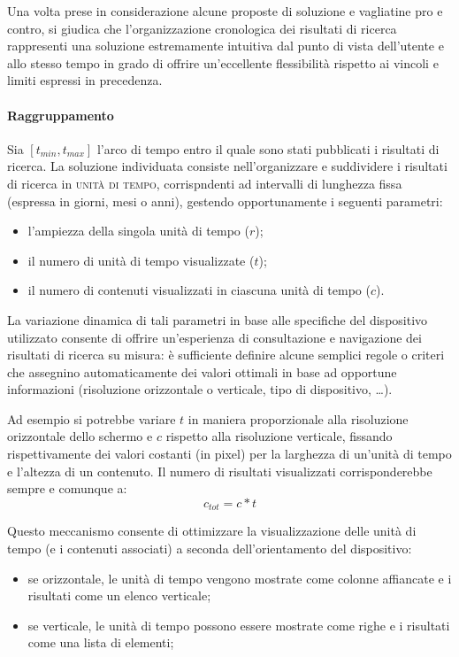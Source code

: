 Una volta prese in considerazione alcune proposte di soluzione e vagliatine pro e contro, si giudica che l'organizzazione cronologica dei risultati di ricerca rappresenti una soluzione estremamente intuitiva dal punto di vista dell'utente e allo stesso tempo in grado di offrire un'eccellente flessibilità rispetto ai vincoli e limiti espressi in precedenza.

\paragraph{Raggruppamento}
Sia $[t_{min}, t_{max}]$ l'arco di tempo entro il quale sono stati pubblicati i risultati di ricerca. La soluzione individuata consiste nell'organizzare e suddividere i risultati di ricerca in \textsc{unità di tempo}, corrispndenti ad intervalli di lunghezza fissa (espressa in giorni, mesi o anni), gestendo opportunamente i seguenti parametri:
\begin{itemize}
  \item l'ampiezza della singola unità di tempo ($r$);
  \item il numero di unità di tempo visualizzate ($t$);
  \item il numero di contenuti visualizzati in ciascuna unità di tempo ($c$).
\end{itemize}

La variazione dinamica di tali parametri in base alle specifiche del dispositivo utilizzato consente di offrire un'esperienza di consultazione e navigazione dei risultati di ricerca su misura: è sufficiente definire alcune semplici regole o criteri che assegnino automaticamente dei valori ottimali in base ad opportune informazioni (risoluzione orizzontale o verticale, tipo di dispositivo, \ldots).

Ad esempio si potrebbe variare $t$ in maniera proporzionale alla risoluzione orizzontale dello schermo e $c$ rispetto alla risoluzione verticale, fissando rispettivamente dei valori costanti (in pixel) per la larghezza di un'unità di tempo e l'altezza di un contenuto. Il numero di risultati visualizzati corrisponderebbe sempre e comunque a:
\begin{equation}
c_{tot} = c * t
\end{equation}

Questo meccanismo consente di ottimizzare la visualizzazione delle unità di tempo (e i contenuti associati) a seconda dell'orientamento del dispositivo:
\begin{itemize}
  \item se orizzontale, le unità di tempo vengono mostrate come colonne affiancate e i risultati come un elenco verticale;
  \item se verticale, le unità di tempo possono essere mostrate come righe e i risultati come una lista di elementi;
\end{itemize}

